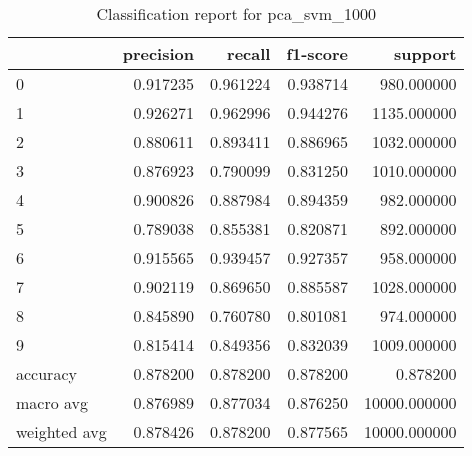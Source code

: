 \begin{table}[htb!]
\centering
\caption{Classification report for pca_svm_1000}
\label{tab:classification-report-pca_svm_1000}
\begin{tabular}{lrrrr}
\toprule
 & precision & recall & f1-score & support \\
\midrule
0 & 0.917235 & 0.961224 & 0.938714 & 980.000000 \\
1 & 0.926271 & 0.962996 & 0.944276 & 1135.000000 \\
2 & 0.880611 & 0.893411 & 0.886965 & 1032.000000 \\
3 & 0.876923 & 0.790099 & 0.831250 & 1010.000000 \\
4 & 0.900826 & 0.887984 & 0.894359 & 982.000000 \\
5 & 0.789038 & 0.855381 & 0.820871 & 892.000000 \\
6 & 0.915565 & 0.939457 & 0.927357 & 958.000000 \\
7 & 0.902119 & 0.869650 & 0.885587 & 1028.000000 \\
8 & 0.845890 & 0.760780 & 0.801081 & 974.000000 \\
9 & 0.815414 & 0.849356 & 0.832039 & 1009.000000 \\
accuracy & 0.878200 & 0.878200 & 0.878200 & 0.878200 \\
macro avg & 0.876989 & 0.877034 & 0.876250 & 10000.000000 \\
weighted avg & 0.878426 & 0.878200 & 0.877565 & 10000.000000 \\
\bottomrule
\end{tabular}
\end{table}

